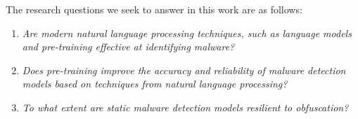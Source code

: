 \documentclass[conference,compsoc]{IEEEtran}
\begin{document}
The research questions we seek to answer in this work are as follows: 

\begin{enumerate}[label=\textbf{RQ\arabic*}:]
    \item \emph{Are modern natural language processing techniques, such as language models and pre-training effective at identifying malware?}
    \item \emph{Does pre-training improve the accuracy and reliability of malware detection models based on techniques from natural language processing?}
    \item \emph{To what extent are static malware detection models resilient to obfuscation?}
\end{enumerate}






\end{document}
